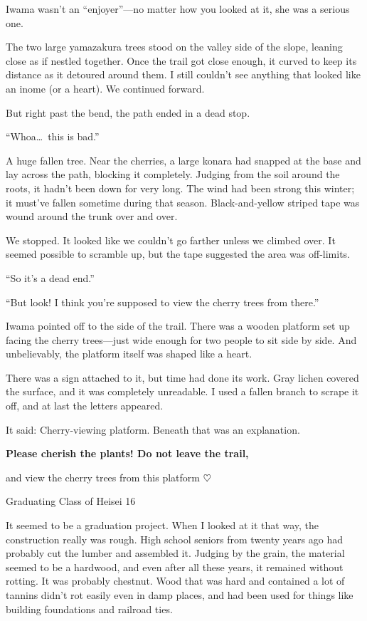 \documentclass[
    a4paper,
    12pt,
    twoside,
    openany,
    UTF8,
    fontset=windows
]{ctexbook}
\begin{document}
Iwama wasn't an ``enjoyer''---no matter how you looked at it, she was a serious one.

The two large yamazakura trees stood on the valley side of the slope, leaning close as if nestled together. Once the trail got close enough, it curved to keep its distance as it detoured around them. I still couldn't see anything that looked like an inome (or a heart). We continued forward.

But right past the bend, the path ended in a dead stop.

``Whoa\dots\ this is bad.''

A huge fallen tree. Near the cherries, a large konara had snapped at the base and lay across the path, blocking it completely. Judging from the soil around the roots, it hadn't been down for very long. The wind had been strong this winter; it must've fallen sometime during that season. Black-and-yellow striped tape was wound around the trunk over and over.

We stopped. It looked like we couldn't go farther unless we climbed over. It seemed possible to scramble up, but the tape suggested the area was off-limits.

``So it's a dead end.''

``But look! I think you're supposed to view the cherry trees from there.''

Iwama pointed off to the side of the trail. There was a wooden platform set up facing the cherry trees---just wide enough for two people to sit side by side. And unbelievably, the platform itself was shaped like a heart.

There was a sign attached to it, but time had done its work. Gray lichen covered the surface, and it was completely unreadable. I used a fallen branch to scrape it off, and at last the letters appeared.

It said: Cherry-viewing platform. Beneath that was an explanation.
\begin{center}
{\bfseries
Please cherish the plants! Do not leave the trail, 

and view the cherry trees from this platform $\heartsuit$

\medskip
Graduating Class of Heisei 16
}
\end{center}

It seemed to be a graduation project. When I looked at it that way, the construction really was rough. High school seniors from twenty years ago had probably cut the lumber and assembled it. Judging by the grain, the material seemed to be a hardwood, and even after all these years, it remained without rotting. It was probably chestnut. Wood that was hard and contained a lot of tannins didn't rot easily even in damp places, and had been used for things like building foundations and railroad ties.
\end{document}
